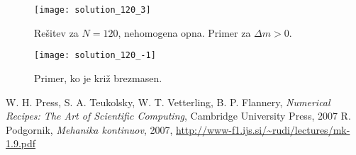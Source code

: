 \documentclass[a4 paper, 12pt]{article}
\begin{document}
\begin{figure}[H]\centering
    \texttt{[image: solution\_120\_3]}
    \vspace{-32pt}
    \caption{Re\v sitev za $N = 120$, nehomogena opna. Primer za $\Delta m > 0$.}
    \vspace{-20pt}
\end{figure}

\begin{figure}[H]\centering
    \texttt{[image: solution\_120\_-1]}
    \vspace{-32pt}
    \caption{Primer, ko je kri\v z brezmasen.}
    \vspace{-20pt}
\end{figure}


\begin{thebibliography}{9}
        W. H. Press, S. A. Teukolsky, W. T. Vetterling, B. P. Flannery,
        {\em Numerical Recipes: The Art of Scientific Computing},
        Cambridge University Press,
        2007
        R. Podgornik,
        {\em Mehanika kontinuov},
        2007,
        \url{http://www-f1.ijs.si/~rudi/lectures/mk-1.9.pdf}
\end{thebibliography}
\end{document}
